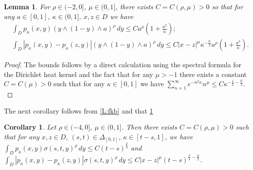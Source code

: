 \documentclass[12pt]{article}
\newtheorem{lemma}[theorem]{Lemma}
\newtheorem{corollary}[theorem]{Corollary}
\theoremstyle{definition}
\DeclareMathOperator{\1}{\mathbbm{1}}%
\renewcommand{\le}{\leqslant}
\begin{document}
\begin{lemma}\label{L:skb} For $\rho\in(-2,0]$,
  $\mu\in(0,1]$,  there exists $C=C(\rho,\mu)>0$ so that for any $a\in[0,1]$, $\kappa\in(0,1]$, $x,z\in D$ we have 
\begin{align*}
&\int_D p_{\kappa}(x,y) (y\wedge (1-y)\wedge a )^{\rho}\, dy\le C
  a^\rho (1+\frac{a^2}{\kappa});\\
&\int_D |p_{\kappa}(x,y)-p_{\kappa}(z,y)| (y\wedge (1-y)\wedge a )^{\rho}\, dy\le C|x-z|^\mu  \kappa^{-\frac\mu2} a^\rho (1+\frac{a^2}{\kappa}).
\end{align*}
\end{lemma}
\begin{proof}
The bounds follows by a direct calculation 
using the spectral formula for the Dirichlet heat kernel and the fact that for any $\mu>-1$ there exists a constant $C=C(\mu)>0$ such that for any 
$\kappa\in[0,1]$ we have $\sum_{n=1}^\infty  e^{-n^2 \kappa } n^\mu\le C \kappa^{-\frac12-\frac\mu2}.$
\end{proof}

The next corollary follows from \cref{L:fkb} and that \cref{L:skb}
\begin{corollary}\label{c:key}
 Let $\rho\in(-4,0]$, $\mu\in(0,1]$. Then there exists $C=C(\rho,\mu)>0$ such that for any $x,z\in D$, $(s,t)\in\Delta_{[0,1]}$, $\kappa\in[ t-s,1]$, we have 
$\int_D p_{\kappa}(x,y) \sigma(s,t,y)^{\rho}\, dy\le
C(t-s)^{\frac\rho4}$ and
$\int_D |p_{\kappa}(x,y)-p_{\kappa}(z,y)| \sigma(s,t,y)^{\rho}\, dy\le C|x-z|^{\mu}(t-s)^{\frac\rho4-\frac\mu2}$. 
\end{corollary}
\end{document}
